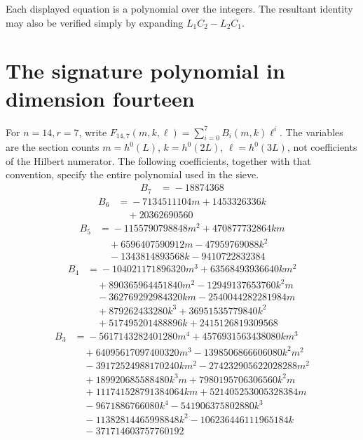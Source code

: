 \documentclass[11pt,reqno,letterpaper]{amsart}
\theoremstyle{definition}
\numberwithin{equation}{section}
\begin{document}
Each displayed equation is a polynomial over the integers. The resultant
identity may also be verified simply by expanding $L_1C_2-L_2C_1$.

\clearpage
\section{The signature polynomial in dimension fourteen}\label{app:n14poly}
For $n=14,r=7$, write
$F_{14,7}(m,k,\ell)=\sum_{i=0}^7B_i(m,k)\ell^i$.
The variables are the section counts $m=h^0(L)$, $k=h^0(2L)$,
$\ell=h^0(3L)$, not coefficients of the Hilbert numerator.
The following coefficients, together with that convention, specify the
entire polynomial used in the sieve.
\begin{align*}
B_7&={}-18874368
\end{align*}
\begin{align*}
B_6&={}-7134511104 m + 1453326336 k\\
&\quad{} + 20362690560
\end{align*}
\begin{align*}
B_5&={}-1155790798848 m^{2} + 470877732864 k m\\
&\quad{} + 6596407590912 m - 47959769088 k^{2}\\
&\quad{} - 1343814893568 k - 9410722832384
\end{align*}
\begin{align*}
B_4&={}-104021171896320 m^{3} + 63568493936640 k m^{2}\\
&\quad{} + 890365964451840 m^{2} - 12949137653760 k^{2} m\\
&\quad{} - 362769292984320 k m - 2540044282281984 m\\
&\quad{} + 879262433280 k^{3} + 36951535779840 k^{2}\\
&\quad{} + 517495201488896 k + 2415126819309568
\end{align*}
\begin{align*}
B_3&={}-5617143282401280 m^{4} + 4576931563438080 k m^{3}\\
&\quad{} + 64095617097400320 m^{3} - 1398506866606080 k^{2} m^{2}\\
&\quad{} - 39172524988170240 k m^{2} - 274232905622028288 m^{2}\\
&\quad{} + 189920685588480 k^{3} m + 7980195706306560 k^{2} m\\
&\quad{} + 111741528791384064 k m + 521405253005328384 m\\
&\quad{} - 9671886766080 k^{4} - 541906375802880 k^{3}\\
&\quad{} - 11382814465998848 k^{2} - 106236446111965184 k\\
&\quad{} - 371714603757760192
\end{align*}
\end{document}
